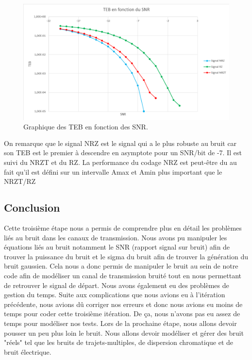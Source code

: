 \begin{figure}[H]
\centering
\includegraphics[width=1\textwidth]{img/graphe ddes teb en fonction des snr.png}
\caption{\label{fig:TEBenFonctionDesSNR}Graphique des TEB en fonction des SNR.}
\end{figure}

On remarque que le signal NRZ est le signal qui a le plus robuste au bruit car son TEB est le premier à descendre  en asymptote pour un SNR/bit de -7. Il est suivi du NRZT et du RZ. La performance du codage NRZ est peut-être du au fait qu'il est défini sur un intervalle Amax et Amin plus important que le NRZT/RZ

\subsection{Conclusion}

Cette troisième étape nous a permis de comprendre plus en détail les problèmes liés au bruit dans les canaux de transmission. Nous avons pu manipuler les équations liés au bruit notamment le SNR (rapport signal sur bruit) afin de trouver la puissance du bruit et le sigma du bruit afin de trouver la génération du bruit gaussien. Cela nous a donc permis de manipuler le bruit au sein de notre code afin de modéliser un canal de transmission bruité tout en nous permettant de retrouver le signal de départ.
Nous avons également eu des problèmes de gestion du temps. Suite aux complications que nous avions eu à l'itération précédente, nous avions dû corriger nos erreurs et donc nous avions eu moins de temps pour coder cette troisième itération. De ça, nous n'avons pas eu assez de temps pour modéliser nos tests.
Lors de la prochaine étape, nous allons devoir pousser un peu plus loin le bruit. Nous allons devoir modéliser et gérer des bruit "réels" tel que les bruits de trajets-multiples, de dispersion chromatique et de bruit électrique.